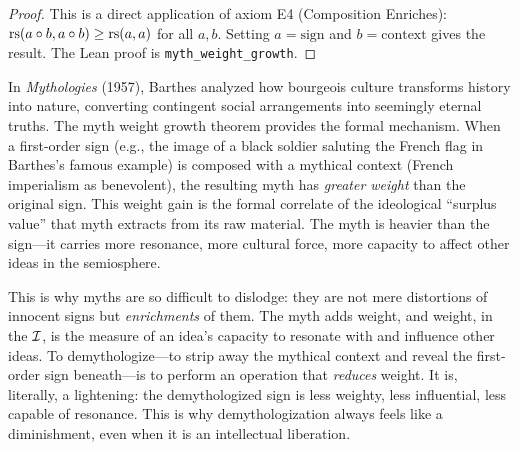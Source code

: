 \begin{proof}
This is a direct application of axiom E4 (Composition Enriches): $\mathrm{rs}(a \circ b, a \circ b) \geq \mathrm{rs}(a, a)$ for all $a, b$. Setting $a = \text{sign}$ and $b = \text{context}$ gives the result. The Lean proof is \texttt{myth\_weight\_growth}.
\end{proof}

\begin{interpretation}
\label{interp:barthes-myth-weight}
In \textit{Mythologies} (1957), Barthes analyzed how bourgeois culture transforms history into nature, converting contingent social arrangements into seemingly eternal truths. The myth weight growth theorem provides the formal mechanism. When a first-order sign (e.g., the image of a black soldier saluting the French flag in Barthes's famous example) is composed with a mythical context (French imperialism as benevolent), the resulting myth has \emph{greater weight} than the original sign. This weight gain is the formal correlate of the ideological ``surplus value'' that myth extracts from its raw material. The myth is heavier than the sign---it carries more resonance, more cultural force, more capacity to affect other ideas in the semiosphere.

This is why myths are so difficult to dislodge: they are not mere distortions of innocent signs but \emph{enrichments} of them. The myth adds weight, and weight, in the $\mathcal{I}$, is the measure of an idea's capacity to resonate with and influence other ideas. To demythologize---to strip away the mythical context and reveal the first-order sign beneath---is to perform an operation that \emph{reduces} weight. It is, literally, a lightening: the demythologized sign is less weighty, less influential, less capable of resonance. This is why demythologization always feels like a diminishment, even when it is an intellectual liberation.
\end{interpretation}

